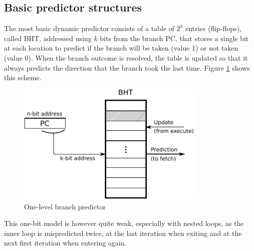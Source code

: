 \subsection{Basic predictor structures}
The most basic dynamic predictor consists of a table of $2^k$ entries (flip-flops), called \ac{BHT}, addressed using $k$ bits from the branch \ac{PC}, that stores a single bit at each location to predict if the branch will be taken (value 1) or not taken (value 0). When the branch outcome is resolved, the table is updated so that it always predicts the direction that the branch took the last time. Figure \ref{fig:one-level-bp} shows this scheme.
\begin{figure}[hbtp]
  \centering
  \includegraphics[width=0.8\textwidth]{img/one-level-bp.pdf}
  \caption[One-level branch predictor]{One-level branch predictor\footnotemark}
  \label{fig:one-level-bp}
\end{figure}

This one-bit model is however quite weak, especially with nested loops, as the inner loop is mispredicted twice, at the last iteration when exiting and at the next first iteration when entering again.

